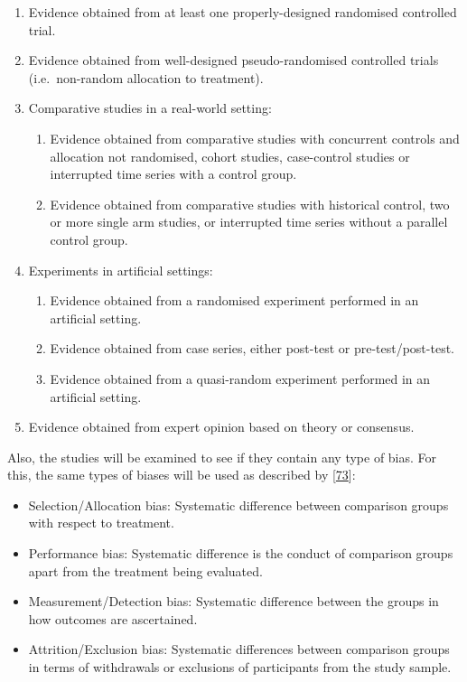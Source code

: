 \documentclass[]{book}
\providecommand{\tightlist}{%
  \setlength{\itemsep}{0pt}\setlength{\parskip}{0pt}}
\begin{document}
\begin{enumerate}
\def\labelenumi{\arabic{enumi}.}
\tightlist
\item
  Evidence obtained from at least one properly-designed randomised
  controlled trial.
\item
  Evidence obtained from well-designed pseudo-randomised controlled
  trials (i.e.~non-random allocation to treatment).
\item
  Comparative studies in a real-world setting:

  \begin{enumerate}
  \def\labelenumii{\arabic{enumii}.}
  \tightlist
  \item
    Evidence obtained from comparative studies with concurrent controls
    and allocation not randomised, cohort studies, case-control studies
    or interrupted time series with a control group.
  \item
    Evidence obtained from comparative studies with historical control,
    two or more single arm studies, or interrupted time series without a
    parallel control group.
  \end{enumerate}
\item
  Experiments in artificial settings:

  \begin{enumerate}
  \def\labelenumii{\arabic{enumii}.}
  \tightlist
  \item
    Evidence obtained from a randomised experiment performed in an
    artificial setting.
  \item
    Evidence obtained from case series, either post-test or
    pre-test/post-test.
  \item
    Evidence obtained from a quasi-random experiment performed in an
    artificial setting.
  \end{enumerate}
\item
  Evidence obtained from expert opinion based on theory or consensus.
\end{enumerate}

Also, the studies will be examined to see if they contain any type of
bias. For this, the same types of biases will be used as described by
{[}\protect\hyperlink{ref-kitchenham2004procedures}{73}{]}:

\begin{itemize}
\tightlist
\item
  Selection/Allocation bias: Systematic difference between comparison
  groups with respect to treatment.
\item
  Performance bias: Systematic difference is the conduct of comparison
  groups apart from the treatment being evaluated.
\item
  Measurement/Detection bias: Systematic difference between the groups
  in how outcomes are ascertained.
\item
  Attrition/Exclusion bias: Systematic differences between comparison
  groups in terms of withdrawals or exclusions of participants from the
  study sample.
\end{itemize}
\end{document}
